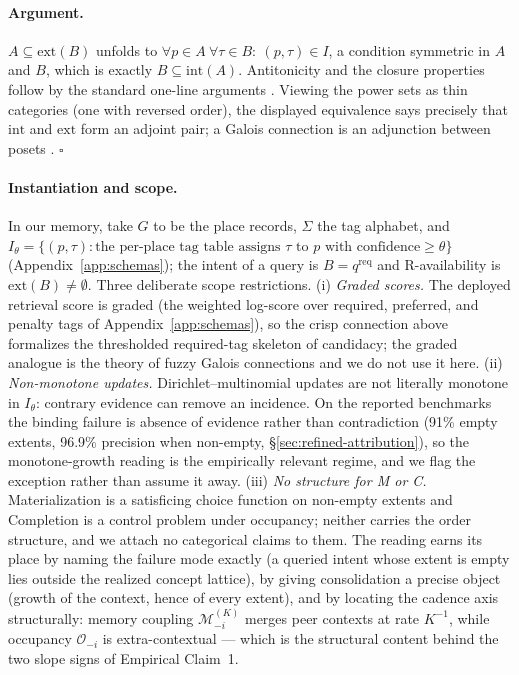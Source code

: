 \documentclass{article}
\begin{document}
\paragraph{Argument.}
$A \subseteq \mathrm{ext}(B)$ unfolds to $\forall p \in A\ \forall \tau \in B:\ (p,\tau) \in I$, a condition symmetric in $A$ and $B$, which is exactly $B \subseteq \mathrm{int}(A)$. Antitonicity and the closure properties follow by the standard one-line arguments \citep[Ch.~1]{ganter1999fca}. Viewing the power sets as thin categories (one with reversed order), the displayed equivalence says precisely that $\mathrm{int}$ and $\mathrm{ext}$ form an adjoint pair; a Galois connection is an adjunction between posets \citep[Ch.~IV]{maclane1998categories}. \hfill$\square$

\paragraph{Instantiation and scope.}
In our memory, take $G$ to be the place records, $\Sigma$ the tag alphabet, and $I_\theta = \{(p,\tau) : \text{the per-place tag table assigns } \tau \text{ to } p \text{ with confidence} \ge \theta\}$ (Appendix~\ref{app:schemas}); the intent of a query is $B = q^{\mathrm{req}}$ and R-availability is $\mathrm{ext}(B) \ne \emptyset$. Three deliberate scope restrictions. (i) \emph{Graded scores.} The deployed retrieval score is graded (the weighted log-score over required, preferred, and penalty tags of Appendix~\ref{app:schemas}), so the crisp connection above formalizes the thresholded required-tag skeleton of candidacy; the graded analogue is the theory of fuzzy Galois connections \citep{belohlavek1999fuzzy} and we do not use it here. (ii) \emph{Non-monotone updates.} Dirichlet--multinomial updates are not literally monotone in $I_\theta$: contrary evidence can remove an incidence. On the reported benchmarks the binding failure is absence of evidence rather than contradiction (91\% empty extents, 96.9\% precision when non-empty, \S\ref{sec:refined-attribution}), so the monotone-growth reading is the empirically relevant regime, and we flag the exception rather than assume it away. (iii) \emph{No structure for M or C.} Materialization is a satisficing choice function on non-empty extents and Completion is a control problem under occupancy; neither carries the order structure, and we attach no categorical claims to them. The reading earns its place by naming the failure mode exactly (a queried intent whose extent is empty lies outside the realized concept lattice), by giving consolidation a precise object (growth of the context, hence of every extent), and by locating the cadence axis structurally: memory coupling $\mathcal{M}^{(K)}_{-i}$ merges peer contexts at rate $K^{-1}$, while occupancy $\mathcal{O}_{-i}$ is extra-contextual --- which is the structural content behind the two slope signs of Empirical Claim~1.
\end{document}
